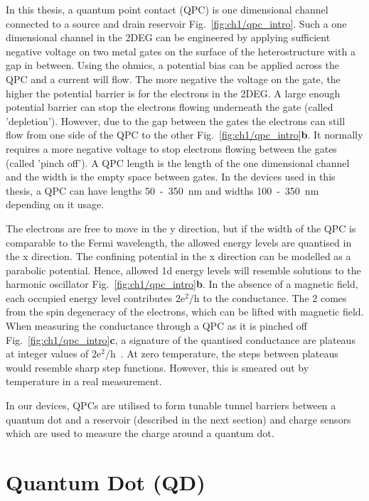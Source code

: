 In this thesis, a quantum point contact (QPC) is one dimensional channel connected to a source and drain reservoir Fig.~\ref{fig:ch1/qpc_intro}. Such a one dimensional channel in the 2DEG can be engineered by applying sufficient negative voltage on two metal gates on the surface of the heterostructure with a gap in between. Using the ohmics, a potential bias can be applied across the QPC and a current will flow. The more negative the voltage on the gate, the higher the potential barrier is for the electrons in the 2DEG. A large enough potential barrier can stop the electrons flowing underneath the gate (called 'depletion'). However, due to the gap between the gates the electrons can still flow from one side of the QPC to the other Fig.~\ref{fig:ch1/qpc_intro}\textbf{b}. It normally requires a more negative voltage to stop electrons flowing between the gates (called 'pinch off'). A QPC length is the length of the one dimensional channel and the width is the empty space between gates. In the devices used in this thesis, a QPC can have lengths 50~-~\qty{350}{nm} and widths 100~-~\qty{350}{nm} depending on it usage.

The electrons are free to move in the y direction, but if the width of the QPC is comparable to the Fermi wavelength, the allowed energy levels are quantised in the x direction. The confining potential in the x direction can be modelled as a parabolic potential. Hence, allowed 1d energy levels will resemble solutions to the harmonic oscillator Fig.~\ref{fig:ch1/qpc_intro}\textbf{b}. In the absence of a magnetic field, each occupied energy level contributes $\mathrm{2e^2/h}$ to the conductance. The $2$ comes from the spin degeneracy of the electrons, which can be lifted with magnetic field. When measuring the conductance through a QPC as it is pinched off Fig.~\ref{fig:ch1/qpc_intro}\textbf{c}, a signature of the quantised conductance are plateaus at integer values of $\mathrm{2e^2/h}$~\cite{qpc_first_measurement}. At zero temperature, the steps between plateaus would resemble sharp step functions. However, this is smeared out by temperature in a real measurement.

In our devices, QPCs are utilised to form tunable tunnel barriers between a quantum dot and a reservoir (described in the next section) and charge sensors~\cite{cs_first_measurement} which are used to measure the charge around a quantum dot. 




\afterpage{\clearpage}
\section{Quantum Dot (QD)}


